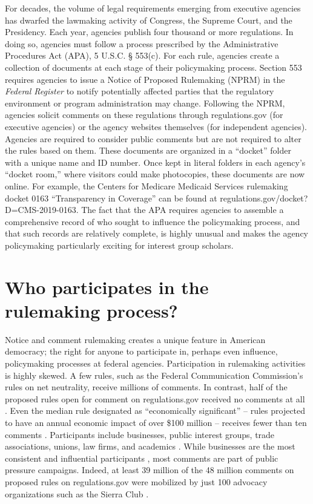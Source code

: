 \documentclass[
      12pt,
        ]{article}
\begin{document}
For decades, the volume of legal requirements emerging from executive
agencies has dwarfed the lawmaking activity of Congress, the Supreme
Court, and the Presidency. Each year, agencies publish four thousand or
more regulations. In doing so, agencies must follow a process prescribed
by the Administrative Procedures Act (APA), 5 U.S.C. § 553(c). For each
rule, agencies create a collection of documents at each stage of their
policymaking process. Section 553 requires agencies to issue a Notice of
Proposed Rulemaking (NPRM) in the \emph{Federal Register} to notify
potentially affected parties that the regulatory environment or program
administration may change. Following the NPRM, agencies solicit comments
on these regulations through regulations.gov (for executive agencies) or
the agency websites themselves (for independent agencies). Agencies are
required to consider public comments but are not required to alter the
rules based on them. These documents are organized in a ``docket''
folder with a unique name and ID number. Once kept in literal folders in
each agency's ``docket room,'' where visitors could make photocopies,
these documents are now online. For example, the Centers for Medicare
Medicaid Services rulemaking docket 0163 ``Transparency in Coverage''
can be found at regulations.gov/docket?D=CMS-2019-0163. The fact that
the APA requires agencies to assemble a comprehensive record of who
sought to influence the policymaking process, and that such records are
relatively complete, is highly unusual and makes the agency policymaking
particularly exciting for interest group scholars.

\hypertarget{who-participates-in-the-rulemaking-process}{%
\section{Who participates in the rulemaking
process?}\label{who-participates-in-the-rulemaking-process}}

Notice and comment rulemaking creates a unique feature in American
democracy; the right for anyone to participate in, perhaps even
influence, policymaking processes at federal agencies. Participation in
rulemaking activities is highly skewed. A few rules, such as the Federal
Communication Commission's rules on net neutrality, receive millions of
comments. In contrast, half of the proposed rules open for comment on
regulations.gov received no comments at all \citep{LibgoberJOP}. Even
the median rule designated as ``economically significant'' -- rules
projected to have an annual economic impact of over \$100 million --
receives fewer than ten comments \citep{judgelord2019SPSA}. Participants
include businesses, public interest groups, trade associations, unions,
law firms, and academics \citep{CuellarALR2005, YackeeJOP2006}. While
businesses are the most consistent and influential participants
\citep{YackeeJOP2006, LibgoberJOP}, most comments are part of public
pressure campaigns. Indeed, at least 39 million of the 48 million
comments on proposed rules on regulations.gov were mobilized by just 100
advocacy organizations such as the Sierra Club
\citep{judgelord2019SPSA}.
\end{document}
